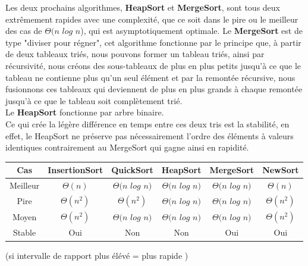 \documentclass[a4paper, 11pt, oneside]{article}
\begin{document}
Les deux prochains algorithmes, \textbf{HeapSort} et \textbf{MergeSort}, sont tous deux extrêmement rapides avec une complexité, que ce soit dans le pire ou le meilleur des cas de $\Theta(n$ $log$ $n$),  qui est asymptotiquement optimale. Le \textbf{MergeSort} est de type "diviser pour régner", cet algorithme fonctionne par le principe que, à partir de deux tableaux triés, nous pouvons former un tableau triés, ainsi par récursivité, nous créons des sous-tableaux de plus en plus petits jusqu'à ce que le tableau ne contienne plus qu'un seul élément et par la remontée récursive, nous fusionnons ces tableaux qui deviennent de plus en plus grands à chaque remontée jusqu'à ce que le tableau soit complètement trié.\\ Le \textbf{HeapSort} fonctionne par arbre binaire. \\
Ce qui crée la légère différence en temps entre ces deux tris est la stabilité, en effet, le HeapSort ne préserve pas nécessairement l’ordre des éléments à valeurs identiques contrairement au MergeSort qui gagne ainsi en rapidité.

\begin{table}[htb]
\begin{tabular}{cccccc}
\hline

Cas   & InsertionSort & QuickSort & HeapSort & MergeSort & NewSort \\ \hline
Meilleur & $\Theta(n)$      & $\Theta(n$ $log$ $n)$   & $\Theta(n$ $log$ $n)$        & $\Theta(n$ $log$ $n)$          & $\Theta(n)$        \\
Pire & $\Theta(n^{2})$     & $\Theta(n^{2})$  & $\Theta(n$ $log$ $n)$         & $\Theta(n$ $log$ $n)$ & $\Theta(n^{2})$       \\
Moyen & $\Theta(n^{2})$      & $\Theta(n$ $log$ $n)$  & $\Theta(n$ $log$ $n)$         & $\Theta(n$ $log$ $n)$         & $\Theta(n^{2})$        \\
Stable & Oui      & Non  & Non         & Oui          & Oui        \\
  
\end{tabular}
\end{table}
(si intervalle de rapport plus élévé = plus rapide )
\end{document}
